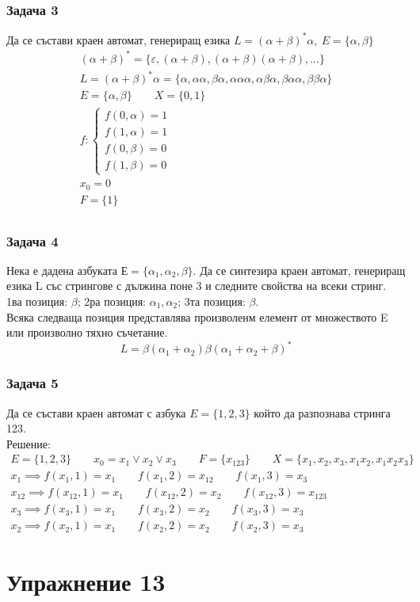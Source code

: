 \documentclass[fleqn, 12pt]{article}
\theoremstyle{definition}
\begin{document}
\subsubsection*{Задача 3}
Да се състави краен автомат, генериращ езика $L = (\alpha + \beta)^* \alpha, \ E = \{ \alpha, \beta \}$
\begin{gather*}
(\alpha + \beta)^* = \{ \varepsilon, (\alpha + \beta), (\alpha + \beta)(\alpha + \beta), ...\} \\
L = (\alpha + \beta)^* \alpha = \{ \alpha, \alpha \alpha, \beta \alpha, \alpha \alpha \alpha, \alpha \beta \alpha, \beta \alpha \alpha, \beta \beta \alpha \} \\
E = \{ \alpha, \beta \} \qquad X = \{0,1\} \\
f: \begin {cases} f(0, \alpha) = 1 \\ f(1, \alpha) = 1 \\ f(0, \beta) = 0 \\ f(1, \beta) = 0   \end{cases} \\
x_0 = 0 \\
F = \{1\}\\
\end{gather*}
\subsubsection*{Задача 4}
Нека е дадена азбуката $Е = \{ \alpha_1, \alpha_2, \beta \}$. Да се синтезира краен автомат, генериращ езика L със стрингове с дължина поне 3 и следните свойства на всеки стринг. \\
1ва позиция: $\beta$; 2ра позиция: $\alpha_1, \alpha_2$; 3та позиция: $\beta$. \\
Всяка следваща позиция представлява произволенм елемент от множеството E или произволно тяхно съчетание. 
$$L = \beta(\alpha_1 + \alpha_2)\beta(\alpha_1 + \alpha_2 + \beta)^*$$

\subsubsection*{Задача 5}
Да се състави краен автомат с азбука $E = \{1,2,3\}$ който да разпознава стринга 123.\\
Решение: 
\begin{gather*}
E = \{1,2,3\} \qquad x_0 = x_1 \lor x_2 \lor x_3 \qquad F = \{x_{123} \} \qquad X = \{ x_1,x_2, x_3,x_1 x_2, x_1 x_2 x_3 \}\\
x_1 \implies f(x_1, 1) = x_1 \qquad f(x_1, 2) = x_{12} \qquad f(x_1, 3) = x_3 \\
x_{12}  \implies f(x_{12}, 1) = x_1 \qquad f(x_{12}, 2) = x_2 \qquad f(x_{12}, 3) = x_{123} \\
x_3 \implies  f(x_3, 1) = x_1 \qquad f(x_3, 2) = x_2 \qquad f(x_3, 3) = x_3 \\
x_2 \implies f(x_2, 1) = x_1 \qquad f(x_2, 2) = x_2 \qquad f(x_2, 3) = x_3 
\end{gather*}


\newpage
\section{ Упражнение 13}
\end{document}
